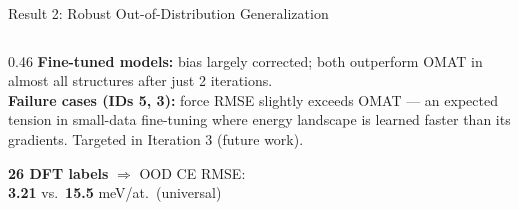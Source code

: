 \documentclass[aspectratio=169,10pt]{beamer}
\newcommand{\wintext}[1]{\textcolor{wincolor}{\textbf{#1}}}
\newcommand{\badtext}[1]{\textcolor{badcolor}{\textbf{#1}}}
\begin{document}
\begin{frame}{Result 2: Robust Out-of-Distribution Generalization}
\begin{columns}[T]
\begin{column}{0.46\textwidth}
    \textbf{Fine-tuned models:} bias largely corrected; both outperform OMAT in
    almost all structures after just 2 iterations.\\[0.4em]

    \textbf{Failure cases (IDs 5, 3):} force RMSE slightly exceeds OMAT — an
    expected tension in small-data fine-tuning where energy landscape is
    learned faster than its gradients. Targeted in Iteration 3 (future work).\\[0.5em]

    \begin{block}{}
      \centering
      \textbf{26 DFT labels} $\Rightarrow$ OOD CE RMSE:\\
      \wintext{3.21} vs.\ \badtext{15.5} meV/at.\ (universal)
    \end{block}
  \end{column}
\end{columns}
\end{frame}
\end{document}
